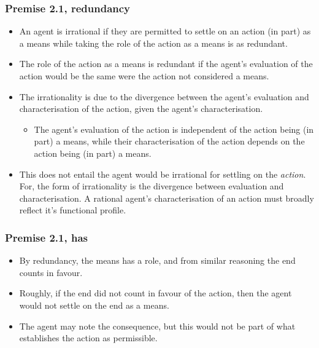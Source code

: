 \documentclass[noamssymb,
]{beamer} %
\begin{document}
\begin{frame}
  \frametitle{Premise 2.1, redundancy}

  \begin{itemize}
  \item An agent is irrational if they are permitted to settle on an action (in part) as a means while taking the role of the action as a means is as redundant.
  \item The role of the action as a means is redundant if the agent's evaluation of the action would be the same were the action not considered a means.
  \item The irrationality is due to the divergence between the agent's evaluation and characterisation of the action, given the agent's characterisation.
  \begin{itemize}
  \item The agent's evaluation of the action is independent of the action being (in part) a means, while their characterisation of the action depends on the action being (in part) a means.
  \end{itemize}
\item This does not entail the agent would be irrational for settling on the \emph{action}.
  For, the form of irrationality is the divergence between evaluation and characterisation.
  A rational agent's characterisation of an action must broadly reflect it's functional profile.
\end{itemize}
\end{frame}

\begin{frame}
  \frametitle{Premise 2.1, has}

  \begin{itemize}
  \item By redundancy, the means has a role, and from similar reasoning the end counts in favour.
  \item Roughly, if the end did not count in favour of the action, then the agent would not settle on the end as a means.
  \item The agent may note the consequence, but this would not be part of what establishes the action as permissible.
  \end{itemize}
\end{frame}
\end{document}
